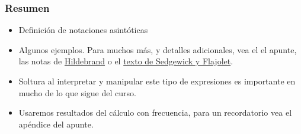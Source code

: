 \documentclass[english, spanish, fleqn,%
hyperref = {colorlinks, urlcolor = blue}%
]{beamer}
\begin{document}
\begin{frame}
  \setcounter{beamerpauses}{2}
  \frametitle{Resumen}

  \begin{itemize}
  \item
    Definición de notaciones asintóticas
  \item
    Algunos ejemplos.
    Para muchos más,
    y detalles adicionales,
    vea el el apunte,
    las notas de
    \href{https://faculty.math.illinois.edu/~hildebr/lecture-notes/asymptotics.pdf}
         {Hildebrand}
    o el \href{https://aofa.cs.princeton.edu/home}
              {texto de Sedgewick y Flajolet}.
  \item
    Soltura al interpretar y manipular este tipo de expresiones
    es importante en mucho de lo que sigue del curso.
  \item
    Usaremos resultados del cálculo con frecuencia,
    para un recordatorio vea el apéndice del apunte.
  \end{itemize}
\end{frame}
\end{document}
